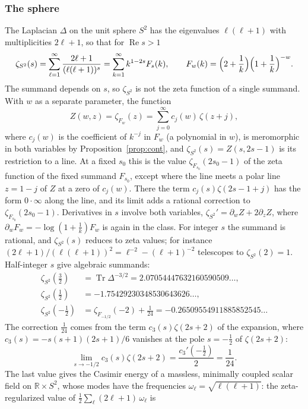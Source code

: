 \documentclass[11pt,reqno]{amsart}
\theoremstyle{definition}
\theoremstyle{remark}
\begin{document}
\subsubsection{The sphere} The Laplacian $\Delta$ on the unit sphere $S^2$ has the eigenvalues $\ell(\ell+1)$ with
multiplicities $2\ell+1$, so that for $\operatorname{Re}s > 1$
\[
  \zeta_{S^2}(s) = \sum_{\ell=1}^{\infty}\frac{2\ell+1}{(\ell(\ell+1))^s} = \sum_{k=1}^{\infty}k^{1-2s}F_s(k), \qquad
  F_w(k) = \Bigl(2+\frac1k\Bigr)\Bigl(1+\frac1k\Bigr)^{-w}.
\]
The summand depends on $s$, so $\zeta_{S^2}$ is not the zeta function of a single summand. With $w$ as a separate
parameter, the function
\[
  Z(w,z) = \zeta_{F_w}(z) = \sum_{j=0}^{\infty}c_j(w)\,\zeta(z+j),
\]
where $c_j(w)$ is the coefficient of $k^{-j}$ in $F_w$ (a polynomial in $w$), is meromorphic in both variables by
Proposition~\ref{prop:cont}, and $\zeta_{S^2}(s) = Z(s, 2s-1)$ is its restriction to a line. At a fixed $s_0$ this is the
value $\zeta_{F_{s_0}}(2s_0-1)$ of the zeta function of the fixed summand $F_{s_0}$, except where the line meets a polar line
$z = 1-j$ of $Z$ at a zero of $c_j(w)$. There the term $c_j(s)\zeta(2s-1+j)$ has the form $0\cdot\infty$ along the line,
and its limit adds a rational correction to $\zeta_{F_{s_0}}(2s_0-1)$. Derivatives in $s$ involve both variables,
$\zeta_{S^2}' = \partial_wZ + 2\partial_zZ$, where $\partial_wF_w = -\log(1+\frac1k)F_w$ is again in the class.
For integer $s$ the summand is rational, and $\zeta_{S^2}(s)$ reduces to zeta values; for instance
$(2\ell+1)/(\ell(\ell+1))^2 = \ell^{-2} - (\ell+1)^{-2}$ telescopes to $\zeta_{S^2}(2) = 1$. Half-integer $s$ give algebraic
summands:
\begin{align*}
  \zeta_{S^2}(\tfrac32) &= \operatorname{Tr}\Delta^{-3/2} = 2.07054447632160590509\ldots, \\
  \zeta_{S^2}(\tfrac12) &= -1.75429230348530643626\ldots, \\
  \zeta_{S^2}(-\tfrac12) &= \zeta_{F_{-1/2}}(-2) + \tfrac1{24} = -0.26509554911885852545\ldots
\end{align*}
The correction $\frac1{24}$ comes from the term $c_3(s)\zeta(2s+2)$ of the expansion, where
$c_3(s) = -s(s+1)(2s+1)/6$ vanishes at the pole $s = -\frac12$ of $\zeta(2s+2)$:
\[
  \lim_{s\to-1/2}c_3(s)\zeta(2s+2) = \frac{c_3'(-\frac12)}{2} = \frac1{24}.
\]
The last value gives the Casimir energy of a massless, minimally coupled scalar field on $\mathbb R\times S^2$, whose
modes have the frequencies $\omega_\ell = \sqrt{\ell(\ell+1)}$: the zeta-regularized value of
$\frac12\sum_\ell(2\ell+1)\,\omega_\ell$ is
\end{document}
